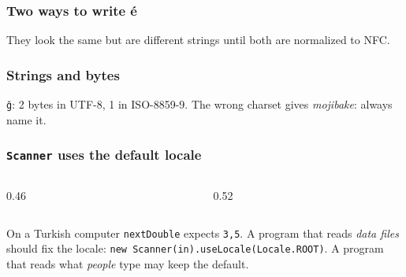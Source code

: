 \documentclass[aspectratio=169,10pt,compress]{beamer}
\begin{document}
\begin{frame}[t,fragile] \frametitle{Two ways to write é}

  \vspace{0.1em}
  \small They look the same but are different strings until both are normalized to NFC.
\end{frame}




\begin{frame}[t,fragile] \frametitle{Strings and bytes}

  \vspace{0.1em}
  \small \texttt{ğ}: 2 bytes in UTF-8, 1 in ISO-8859-9. The wrong charset gives \emph{mojibake}: always name it.
\end{frame}





\begin{frame}[t,fragile] \frametitle{\texttt{Scanner} uses the default locale}
  \begin{columns}[T]
    \begin{column}{0.46\textwidth}
    \end{column}
    \begin{column}{0.52\textwidth}
    \end{column}
  \end{columns}
  \vspace{0.1em}
  \small On a Turkish computer \texttt{nextDouble} expects \texttt{3,5}. A program that reads \emph{data files}
  should fix the locale: \texttt{new Scanner(in).useLocale(Locale.ROOT)}. A program that reads what
  \emph{people} type may keep the default.
\end{frame}
\end{document}
